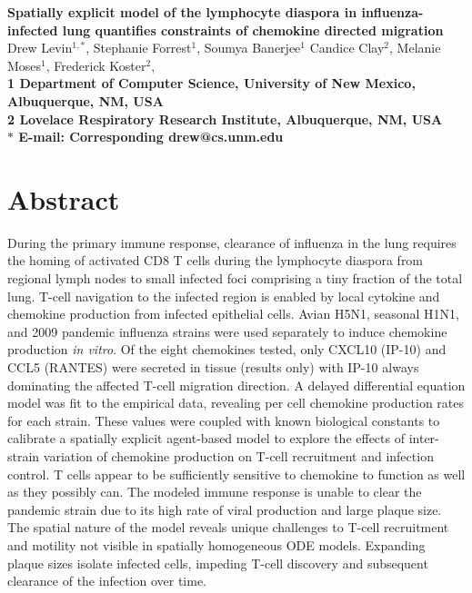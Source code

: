 \documentclass[10pt]{article}
\date{}
\begin{document}
\begin{flushleft}
{\Large
\textbf{Spatially explicit model of the lymphocyte diaspora in influenza-infected lung quantifies constraints of chemokine directed migration}
}
\\
Drew Levin$^{1,\ast}$, 
Stephanie Forrest$^{1}$, 
Soumya Banerjee$^{1}$
Candice Clay$^{2}$, 
Melanie Moses$^{1}$, 
Frederick Koster$^{2}$, 
\\
\bf{1} Department of Computer Science, University of New Mexico, Albuquerque, NM, USA
\\
\bf{2} Lovelace Respiratory Research Institute, Albuquerque, NM, USA
\\
$\ast$ E-mail: Corresponding drew@cs.unm.edu
\end{flushleft}



\section*{Abstract}

During the primary immune response, clearance of influenza in the lung requires the homing of activated CD8 T cells during the lymphocyte diaspora from regional lymph nodes to small infected foci comprising a tiny fraction of the total lung.  T-cell navigation to the infected region is enabled by local cytokine and chemokine production from infected epithelial cells.  Avian H5N1, seasonal H1N1, and 2009 pandemic influenza strains were used separately to induce chemokine production \textit{in vitro}.  Of the eight chemokines tested, only CXCL10 (IP-10) and CCL5 (RANTES) were secreted in tissue  (results only) with IP-10 always dominating the affected T-cell migration direction.  A delayed differential equation model was fit to the empirical data, revealing per cell chemokine production rates for each strain.  These values were coupled with known biological constants to calibrate a spatially explicit agent-based model to explore the effects of inter-strain variation of chemokine production on T-cell recruitment and infection control.  T cells appear to be sufficiently sensitive to chemokine to function as well as they possibly can.  The modeled immune response is unable to clear the pandemic strain due to its high rate of viral production and large plaque size.  The spatial nature of the model reveals unique challenges to T-cell recruitment and motility not visible in spatially homogeneous ODE models.  Expanding plaque sizes isolate infected cells, impeding T-cell discovery and subsequent clearance of the infection over time.  
\end{document}
